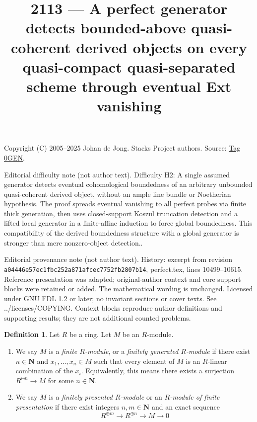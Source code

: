 \documentclass{amsart}
\theoremstyle{plain}
\theoremstyle{definition}
\newtheorem{definition}[subsection]{Definition}
\theoremstyle{remark}
\numberwithin{equation}{subsection}
\begin{document}
\title[Stacks Project, Tag 0GEN]{2113 --- A perfect generator detects bounded-above quasi-coherent derived objects on every quasi-compact quasi-separated scheme through eventual Ext vanishing}
\maketitle
\noindent Copyright (C) 2005--2025 Johan de Jong. Stacks Project authors. Source: \href{https://stacks.math.columbia.edu/tag/0GEN}{Tag 0GEN}.

\noindent Editorial difficulty note (not author text). Difficulty H2: A single assumed generator detects eventual cohomological boundedness of an arbitrary unbounded quasi-coherent derived object, without an ample line bundle or Noetherian hypothesis. The proof spreads eventual vanishing to all perfect probes via finite thick generation, then uses closed-support Koszul truncation detection and a lifted local generator in a finite-affine induction to force global boundedness. This compatibility of the derived boundedness structure with a global generator is stronger than mere nonzero-object detection..

\noindent Editorial provenance note (not author text). History: excerpt from revision \texttt{a0444\allowbreak 6e57e\allowbreak c1fbc\allowbreak 252a8\allowbreak 71afc\allowbreak ec775\allowbreak 2fb28\allowbreak 07b14}, perfect.tex, lines 10499--10615. Reference presentation was adapted; original-author context and core support blocks were retained or added. The mathematical wording is unchanged. Licensed under GNU FDL 1.2 or later; no invariant sections or cover texts. See ../licenses/COPYING. Context blocks reproduce author definitions and supporting results; they are not additional counted problems.

\begin{definition}
\label{algebra-definition-module-finite-type}
Let $R$ be a ring. Let $M$ be an $R$-module.
\begin{enumerate}
\item We say $M$ is a {\it finite $R$-module}, or a {\it finitely generated
$R$-module} if there exist $n \in \mathbf{N}$ and $x_1, \ldots, x_n \in M$
such that every element of $M$ is an $R$-linear combination of the $x_i$.
Equivalently, this means there exists a surjection
$R^{\oplus n} \to M$ for some $n \in \mathbf{N}$.
\item We say $M$ is a {\it finitely presented $R$-module} or an
{\it $R$-module of finite presentation} if there exist integers
$n, m \in \mathbf{N}$ and an exact sequence
$$
R^{\oplus m} \longrightarrow R^{\oplus n} \longrightarrow M \longrightarrow 0
$$
\end{enumerate}
\end{definition}
\end{document}
